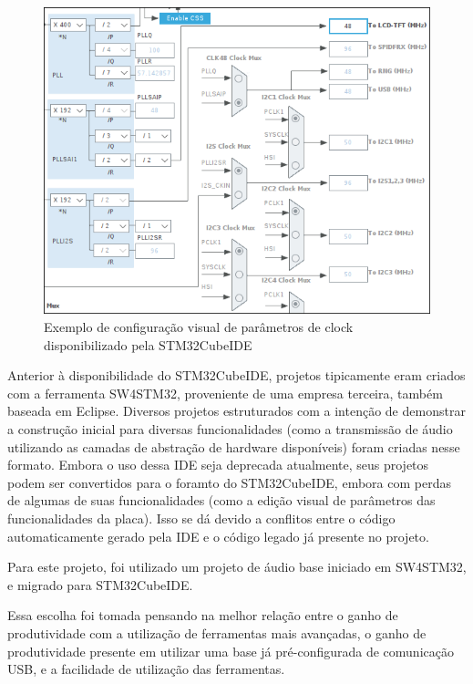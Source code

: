 \begin{figure}[!h]
  \includegraphics[scale=0.5]{figuras/clock.png}
  \caption{Exemplo de configuração visual de parâmetros de clock disponibilizado pela STM32CubeIDE}
  \label{fig:visualClockEdit}
\end{figure}


Anterior à disponibilidade do STM32CubeIDE, projetos tipicamente eram criados com a ferramenta SW4STM32, proveniente de uma empresa terceira, também baseada em Eclipse. Diversos projetos estruturados com a intenção de demonstrar a construção inicial para diversas funcionalidades (como a transmissão de áudio utilizando as camadas de abstração de hardware disponíveis) foram criadas nesse formato. Embora o uso dessa IDE seja deprecada atualmente, seus projetos podem ser convertidos para o foramto do STM32CubeIDE, embora com perdas de algumas de suas funcionalidades (como a edição visual de parâmetros das funcionalidades da placa). Isso se dá devido a conflitos entre o código automaticamente gerado pela IDE e o código legado já presente no projeto.

Para este projeto, foi utilizado um projeto de áudio base iniciado em SW4STM32, e migrado para STM32CubeIDE. 

\color{orange}
Essa escolha foi tomada pensando na melhor relação entre o ganho de produtividade com a utilização de ferramentas mais avançadas, o ganho de produtividade presente em utilizar uma base já pré-configurada de comunicação USB, e a facilidade de utilização das ferramentas.
\color{black}


